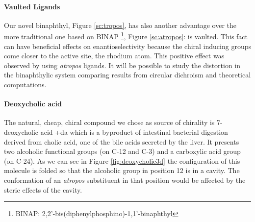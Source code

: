 \paragraph{Vaulted Ligands}
Our novel bi\-naphthyl, Figure \ref{sc:tropos}, has also another advantage over the more traditional one based on BINAP \footnote{BINAP: 2,2'-bis(diphenylphosphino)-1,1'-bi\-naphthyl}, Figure \ref{sc:atropos}: is vaulted. This fact can have beneficial effects on enantioselectivity because the chiral inducing groups come closer to the active site, the rhodium atom. This positive effect was observed by \citet{Bao1993} using \emph{atropos} ligands.
It will be possible to study the distortion in the bi\-naphthylic system comparing results from circular dichroism and theoretical computations.


% 


% 



\paragraph{Deoxycholic acid}
The natural, cheap, chiral compound we chose as source of chirality is 7-deoxy\-cholic acid \cmpd+{da} which is a byproduct of intestinal bacterial digestion 
derived from cholic acid, one of the bile acids secreted by the liver. It presents two alcoholic functional groups (on C-12 and C-3) and a carboxylic acid group (on C-24). 
As we can see in Figure \ref{fig:deoxycholic3d} the configuration of this molecule is folded so that the alcoholic group in position 12 is in a cavity. \label{dodici}
The conformation of an \emph{atropos} substituent in that position would be affected by the steric effects of the cavity.

